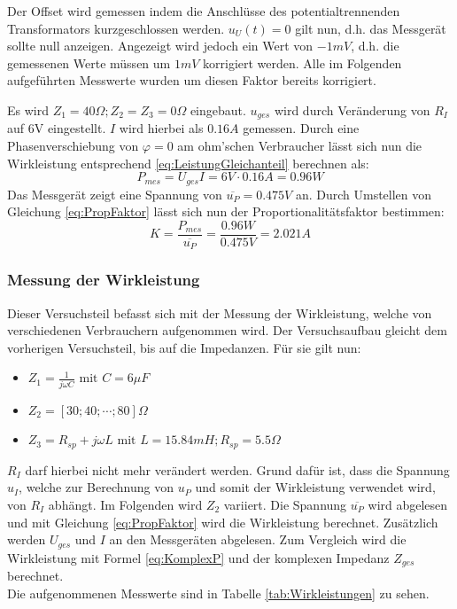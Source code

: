 Der Offset wird gemessen indem die Anschlüsse des potentialtrennenden Transformators kurzgeschlossen werden. $u_U(t)=0$ gilt nun, d.h. das Messgerät sollte null anzeigen.
Angezeigt wird jedoch ein Wert von $-1mV$, d.h. die gemessenen Werte müssen um $1mV$ korrigiert werden. Alle im Folgenden aufgeführten Messwerte wurden um diesen Faktor bereits korrigiert.

Es wird $Z_1 = 40\Omega; Z_2 = Z_3 = 0\Omega$ eingebaut. $u_{ges}$ wird durch Veränderung von $R_I$ auf 6V eingestellt. $I$ wird hierbei als $0.16A$ gemessen. Durch eine Phasenverschiebung von $\varphi = 0$ am ohm'schen Verbraucher lässt sich nun die Wirkleistung entsprechend \eqref{eq:LeistungGleichanteil} berechnen als:
\begin{equation*}
P_{mes}=U_{ges}I = 6V\cdot 0.16A = 0.96W
\end{equation*}
Das Messgerät zeigt eine Spannung von $\overline{u_P}=0.475V$ an. 
Durch Umstellen von Gleichung \eqref{eq:PropFaktor} lässt sich nun der Proportionalitätsfaktor bestimmen:
\begin{equation*}
K=\frac{P_{mes}}{\overline{u_P}} = \frac{0.96W}{0.475V} = 2.021A
\end{equation*}

\subsubsection{Messung der Wirkleistung}

Dieser Versuchsteil befasst sich mit der Messung der Wirkleistung, welche von verschiedenen Verbrauchern aufgenommen wird. Der Versuchsaufbau gleicht dem vorherigen Versuchsteil, bis auf die Impedanzen. Für sie gilt nun:
\begin{itemize}
\item $Z_1 = \frac{1}{j\omega C} \mbox{ mit } C = 6\mu F$
\item $Z_2 = [30; 40; \cdots; 80]\Omega$
\item $Z_3 = R_{sp} + j\omega L \mbox{ mit } L = 15.84mH; R_{sp} = 5.5\Omega$
\end{itemize}
$R_I$ darf hierbei nicht mehr verändert werden. Grund dafür ist, dass die Spannung $u_I$, welche zur Berechnung von $u_P$ und somit der Wirkleistung verwendet wird, von $R_I$ abhängt.
Im Folgenden wird $Z_2$ variiert. Die Spannung $\overline{u_P}$ wird abgelesen und mit Gleichung \eqref{eq:PropFaktor} wird die Wirkleistung berechnet. Zusätzlich werden $U_{ges}$ und $I$ an den Messgeräten abgelesen. Zum Vergleich wird die Wirkleistung mit Formel \eqref{eq:KomplexP} und der komplexen Impedanz $Z_{ges}$ berechnet.
\\
Die aufgenommenen Messwerte sind in Tabelle \ref{tab:Wirkleistungen} zu sehen.

